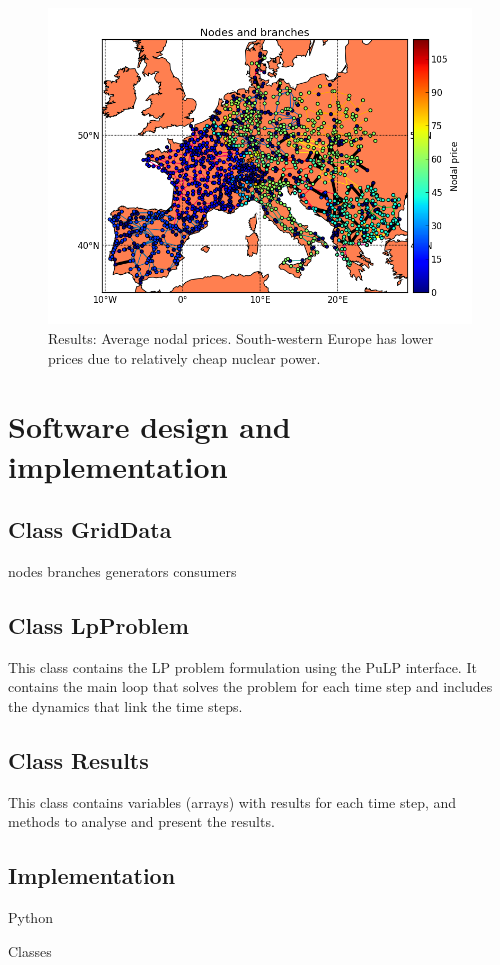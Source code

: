 \documentclass{article}
\begin{document}
\begin{figure}
\centering
\includegraphics[scale=0.6]{example_2w_map_nodalprices.png}
\caption{Results: Average nodal prices. South-western Europe has lower prices due to relatively cheap nuclear power. }
\label{fig:example_map_prices}
\end{figure}



\newpage
\appendix

\section{Software design and implementation}

\subsection{Class GridData}
nodes
branches
generators
consumers

\subsection{Class LpProblem}
This class contains the LP problem formulation using the PuLP interface. It contains the main loop that solves the problem for each time step and includes the dynamics that link the time steps.


\subsection{Class Results}
This class contains variables (arrays) with results for each time step, and methods to analyse and present the results.


\subsection{Implementation}
Python

Classes




%
%

\end{document}
